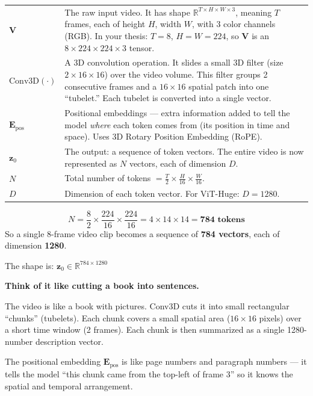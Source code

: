\documentclass[12pt, a4paper]{article}
\begin{document}
\begin{explainbox}
\begin{tabular}{lp{11cm}}
$\mathbf{V}$ & The raw input video. It has shape $\mathbb{R}^{T \times H \times W \times 3}$, meaning $T$ frames, each of height $H$, width $W$, with 3 color channels (RGB). In your thesis: $T=8$, $H=W=224$, so $\mathbf{V}$ is an $8 \times 224 \times 224 \times 3$ tensor. \\[0.3cm]
$\text{Conv3D}(\cdot)$ & A 3D convolution operation. It slides a small 3D filter (size $2 \times 16 \times 16$) over the video volume. This filter groups 2 consecutive frames and a $16\times16$ spatial patch into one ``tubelet.'' Each tubelet is converted into a single vector. \\[0.3cm]
$\mathbf{E}_{\text{pos}}$ & Positional embeddings --- extra information added to tell the model \textit{where} each token comes from (its position in time and space). Uses 3D Rotary Position Embedding (RoPE). \\[0.3cm]
$\mathbf{z}_0$ & The output: a sequence of token vectors. The entire video is now represented as $N$ vectors, each of dimension $D$. \\[0.3cm]
$N$ & Total number of tokens $= \frac{T}{2} \times \frac{H}{16} \times \frac{W}{16}$. \\[0.3cm]
$D$ & Dimension of each token vector. For ViT-Huge: $D = 1280$.
\end{tabular}
\end{explainbox}

\begin{examplebox}
\[
N = \frac{8}{2} \times \frac{224}{16} \times \frac{224}{16} = 4 \times 14 \times 14 = \mathbf{784 \text{ tokens}}
\]
So a single 8-frame video clip becomes a sequence of \textbf{784 vectors}, each of dimension \textbf{1280}.

The shape is: $\mathbf{z}_0 \in \mathbb{R}^{784 \times 1280}$
\end{examplebox}

\begin{analogybox}
\textbf{Think of it like cutting a book into sentences.}

The video is like a book with pictures. Conv3D cuts it into small rectangular ``chunks'' (tubelets). Each chunk covers a small spatial area ($16 \times 16$ pixels) over a short time window (2 frames). Each chunk is then summarized as a single 1280-number description vector.

The positional embedding $\mathbf{E}_{\text{pos}}$ is like page numbers and paragraph numbers --- it tells the model ``this chunk came from the top-left of frame 3'' so it knows the spatial and temporal arrangement.
\end{analogybox}
\end{document}
